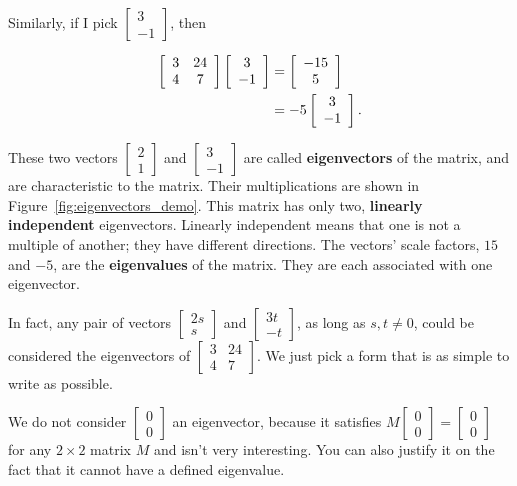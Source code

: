 \documentclass[../gatm.tex]{subfiles}
\begin{document}
\noindent Similarly, if I pick $\left[\begin{array}{c}3 \\ -1\end{array}\right]$, then 

\begin{align*}
\left[\begin{array}{cc} 3 & 24 \\ 4 & 7 \end{array}\right]\left[\begin{array}{c} 3 \\ -1 \end{array}\right]&=\left[\begin{array}{c} -15 \\ 5 \end{array}\right] \\
&= -5\left[\begin{array}{c} 3 \\ -1 \end{array}\right].
\end{align*}

\noindent These two vectors $\left[\begin{array}{c}2 \\ 1 \end{array}\right]$ and $\left[\begin{array}{c} 3 \\ -1 \end{array}\right]$ are called \textbf{eigenvectors} of the matrix, and are characteristic to the matrix. Their multiplications are shown in Figure~\ref{fig:eigenvectors_demo}. This matrix has only two, \textbf{linearly independent} eigenvectors. Linearly independent means that one is not a multiple of another; they have different directions. The vectors' scale factors, $15$ and $-5$, are the \textbf{eigenvalues} of the matrix. They are each associated with one eigenvector.

In fact, any pair of vectors $\left[\begin{array}{c}2s \\ s \end{array}\right]$ and $\left[\begin{array}{c} 3t \\ -t \end{array}\right]$, as long as $s,t\neq 0$, could be considered the eigenvectors of $\left[\begin{array}{cc}3 & 24 \\ 4 & 7\end{array}\right]$. We just pick a form that is as simple to write as possible.

We do not consider $\left[\begin{array}{c} 0 \\ 0 \end{array}\right]$ an eigenvector, because it satisfies $M\left[\begin{array}{c} 0 \\ 0 \end{array}\right]=\left[\begin{array}{c} 0 \\ 0 \end{array}\right]$ for any $2\times 2$ matrix $M$ and isn't very interesting. You can also justify it on the fact that it cannot have a defined eigenvalue.
\end{document}
